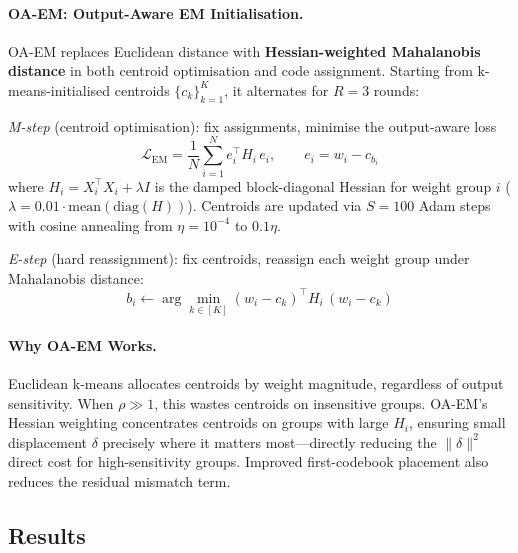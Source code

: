 \documentclass[11pt]{article}
\begin{document}
\paragraph{OA-EM: Output-Aware EM Initialisation.}
OA-EM replaces Euclidean distance with \textbf{Hessian-weighted Mahalanobis distance} in both centroid optimisation and code assignment. Starting from k-means-initialised centroids $\{c_k\}_{k=1}^{K}$, it alternates for $R = 3$ rounds:

\textit{M-step} (centroid optimisation): fix assignments, minimise the output-aware loss
\begin{equation}
    \mathcal{L}_{\mathrm{EM}} = \frac{1}{N} \sum_{i=1}^{N} e_{i}^{\top} H_{i}\, e_{i}, \qquad e_{i} = w_{i} - c_{b_{i}}
\end{equation}
where $H_{i} = X_{i}^{\top} X_{i} + \lambda I$ is the damped block-diagonal Hessian for weight group $i$ ($\lambda = 0.01 \cdot \mathrm{mean}(\mathrm{diag}(H))$). Centroids are updated via $S = 100$ Adam steps with cosine annealing from $\eta = 10^{-4}$ to $0.1\eta$.

\textit{E-step} (hard reassignment): fix centroids, reassign each weight group under Mahalanobis distance:
\begin{equation}
    b_{i} \leftarrow \arg\min_{k \in [K]} (w_{i} - c_k)^{\top} H_{i}\, (w_{i} - c_k)
\end{equation}

\paragraph{Why OA-EM Works.}
Euclidean k-means allocates centroids by weight magnitude, regardless of output sensitivity. When $\rho \gg 1$, this wastes centroids on insensitive groups. OA-EM's Hessian weighting concentrates centroids on groups with large $H_{i}$, ensuring small displacement $\delta$ precisely where it matters most---directly reducing the $\|\delta\|^{2}$ direct cost for high-sensitivity groups. Improved first-codebook placement also reduces the residual mismatch term.

\subsection{Results}
\end{document}
